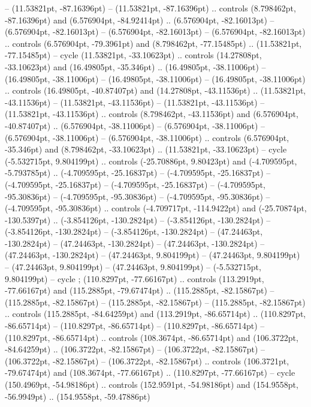  -- (11.53821pt, -87.16396pt)
 -- (11.53821pt, -87.16396pt) .. controls (8.798462pt, -87.16396pt) and (6.576904pt, -84.92414pt) .. (6.576904pt, -82.16013pt)
 -- (6.576904pt, -82.16013pt)
 -- (6.576904pt, -82.16013pt)
 -- (6.576904pt, -82.16013pt) .. controls (6.576904pt, -79.3961pt) and (8.798462pt, -77.15485pt) .. (11.53821pt, -77.15485pt) -- cycle
(11.53821pt, -33.10623pt) .. controls (14.27808pt, -33.10623pt) and (16.49805pt, -35.346pt) .. (16.49805pt, -38.11006pt)
 -- (16.49805pt, -38.11006pt)
 -- (16.49805pt, -38.11006pt)
 -- (16.49805pt, -38.11006pt) .. controls (16.49805pt, -40.87407pt) and (14.27808pt, -43.11536pt) .. (11.53821pt, -43.11536pt)
 -- (11.53821pt, -43.11536pt)
 -- (11.53821pt, -43.11536pt)
 -- (11.53821pt, -43.11536pt) .. controls (8.798462pt, -43.11536pt) and (6.576904pt, -40.87407pt) .. (6.576904pt, -38.11006pt)
 -- (6.576904pt, -38.11006pt)
 -- (6.576904pt, -38.11006pt)
 -- (6.576904pt, -38.11006pt) .. controls (6.576904pt, -35.346pt) and (8.798462pt, -33.10623pt) .. (11.53821pt, -33.10623pt) -- cycle
(-5.532715pt, 9.804199pt) .. controls (-25.70886pt, 9.80423pt) and (-4.709595pt, -5.793785pt) .. (-4.709595pt, -25.16837pt)
 -- (-4.709595pt, -25.16837pt)
 -- (-4.709595pt, -25.16837pt)
 -- (-4.709595pt, -25.16837pt)
 -- (-4.709595pt, -95.30836pt)
 -- (-4.709595pt, -95.30836pt)
 -- (-4.709595pt, -95.30836pt)
 -- (-4.709595pt, -95.30836pt) .. controls (-4.709717pt, -114.9422pt) and (-25.70874pt, -130.5397pt) .. (-3.854126pt, -130.2824pt)
 -- (-3.854126pt, -130.2824pt)
 -- (-3.854126pt, -130.2824pt)
 -- (-3.854126pt, -130.2824pt)
 -- (47.24463pt, -130.2824pt)
 -- (47.24463pt, -130.2824pt)
 -- (47.24463pt, -130.2824pt)
 -- (47.24463pt, -130.2824pt)
 -- (47.24463pt, 9.804199pt)
 -- (47.24463pt, 9.804199pt)
 -- (47.24463pt, 9.804199pt)
 -- (47.24463pt, 9.804199pt)
 -- (-5.532715pt, 9.804199pt) -- cycle
;
(110.8297pt, -77.66167pt) .. controls (113.2919pt, -77.66167pt) and (115.2885pt, -79.67474pt) .. (115.2885pt, -82.15867pt)
 -- (115.2885pt, -82.15867pt)
 -- (115.2885pt, -82.15867pt)
 -- (115.2885pt, -82.15867pt) .. controls (115.2885pt, -84.64259pt) and (113.2919pt, -86.65714pt) .. (110.8297pt, -86.65714pt)
 -- (110.8297pt, -86.65714pt)
 -- (110.8297pt, -86.65714pt)
 -- (110.8297pt, -86.65714pt) .. controls (108.3674pt, -86.65714pt) and (106.3722pt, -84.64259pt) .. (106.3722pt, -82.15867pt)
 -- (106.3722pt, -82.15867pt)
 -- (106.3722pt, -82.15867pt)
 -- (106.3722pt, -82.15867pt) .. controls (106.3721pt, -79.67474pt) and (108.3674pt, -77.66167pt) .. (110.8297pt, -77.66167pt) -- cycle
(150.4969pt, -54.98186pt) .. controls (152.9591pt, -54.98186pt) and (154.9558pt, -56.9949pt) .. (154.9558pt, -59.47886pt)
